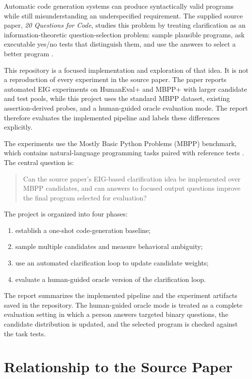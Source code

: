 Automatic code generation systems can produce syntactically valid programs while still misunderstanding an underspecified requirement. The supplied source paper, \emph{20 Questions for Code}, studies this problem by treating clarification as an information-theoretic question-selection problem: sample plausible programs, ask executable yes/no tests that distinguish them, and use the answers to select a better program \cite{garg2026twenty}.

This repository is a focused implementation and exploration of that idea. It is not a reproduction of every experiment in the source paper. The paper reports automated EIG experiments on HumanEval+ and MBPP+ with larger candidate and test pools, while this project uses the standard MBPP dataset, existing assertion-derived probes, and a human-guided oracle evaluation mode. The report therefore evaluates the implemented pipeline and labels these differences explicitly.

The experiments use the Mostly Basic Python Problems (MBPP) benchmark, which contains natural-language programming tasks paired with reference tests \cite{austin2021program}. The central question is:

\begin{quote}
Can the source paper's EIG-based clarification idea be implemented over MBPP candidates, and can answers to focused output questions improve the final program selected for evaluation?
\end{quote}

The project is organized into four phases:
\begin{enumerate}[leftmargin=*]
	\item establish a one-shot code-generation baseline;
	\item sample multiple candidates and measure behavioral ambiguity;
	\item use an automated clarification loop to update candidate weights;
	\item evaluate a human-guided oracle version of the clarification loop.
\end{enumerate}

The report summarizes the implemented pipeline and the experiment artifacts saved in the repository. The human-guided oracle mode is treated as a complete evaluation setting in which a person answers targeted binary questions, the candidate distribution is updated, and the selected program is checked against the task tests.

\section{Relationship to the Source Paper}

